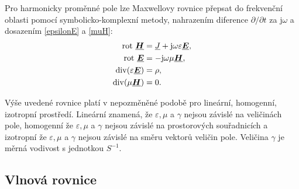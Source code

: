 \documentclass[12pt,a4paper,oneside]{article}
\numberwithin{equation}{section} %
\numberwithin{figure}{section} %
\numberwithin{table}{section} %
\newcommand{\mj}{\mathrm{j}} %
\renewcommand{\vec}[1]{\mbox{\boldmath$#1$}} %
\newcommand{\faz}[1]{{\underline{#1}}} %
\newcommand{\rot}{\mathrm{rot}\ }
\begin{document}
Pro harmonicky proměnné pole lze Maxwellovy rovnice přepsat do frekvenční oblasti pomocí symbolicko-komplexní metody, nahrazením diference $\partial / \partial t$ za $\mj \omega$ a dosazením \ref{epsilonE} a \ref{muH}:
\begin{subequations}
\begin{align}
\rot \faz{\vec{H}} &= \faz{J} + \mj \omega \varepsilon \faz{\vec{E}},
\\
\rot \faz{\vec{E}} &= - \mj \omega \mu \faz{\vec{H}},
\\
\udiv (\varepsilon \faz{\vec{E}}) &= \rho,
\\
\udiv (\mu \faz{\vec{H}}) &= 0.
\end{align}
\end{subequations}

Výše uvedené rovnice platí v nepozměněné podobě pro lineární, homogenní, izotropní prostředí. Lineární znamená, že $\varepsilon , \mu$ a $\gamma$ nejsou závislé na veličinách pole, homogenní že $\varepsilon , \mu$ a $\gamma$ nejsou závislé na prostorových souřadnicích a izotropní že $\varepsilon , \mu$ a $\gamma$ nejsou závislé na směru vektorů veličin pole. Veličina $\gamma$ je měrná vodivost s jednotkou $S ^{-1}$.


\subsection{Vlnová rovnice}
\end{document}
